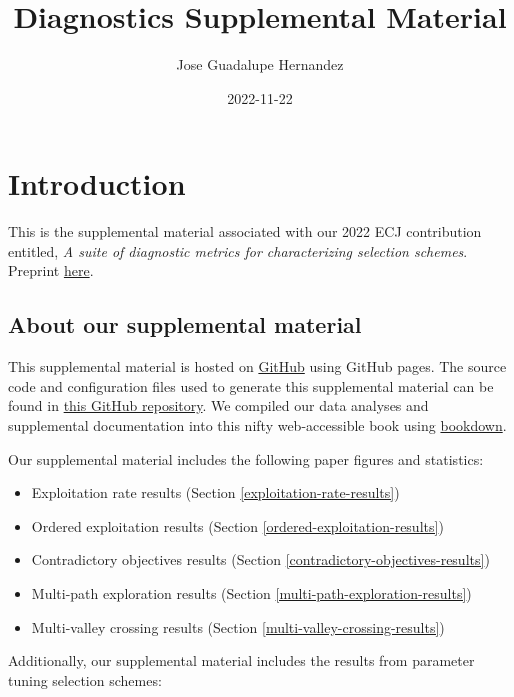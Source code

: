 \documentclass[]{book}
\title{Diagnostics Supplemental Material}
\author{Jose Guadalupe Hernandez}
\date{2022-11-22}
\providecommand{\tightlist}{%
  \setlength{\itemsep}{0pt}\setlength{\parskip}{0pt}}
\begin{document}
\maketitle

{
\setcounter{tocdepth}{1}
\tableofcontents
}
\hypertarget{introduction}{%
\chapter{Introduction}\label{introduction}}

This is the supplemental material associated with our 2022 ECJ contribution entitled, \emph{A suite of diagnostic metrics for characterizing selection schemes}.
Preprint \href{https://arxiv.org/pdf/2204.13839.pdf}{here}.

\hypertarget{about-our-supplemental-material}{%
\section{About our supplemental material}\label{about-our-supplemental-material}}

This supplemental material is hosted on \href{https://github.com}{GitHub} using GitHub pages.
The source code and configuration files used to generate this supplemental material can be found in \href{https://github.com/jgh9094/ECJ-2022-suite-of-diagnostics-for-selection-schemes}{this GitHub repository}.
We compiled our data analyses and supplemental documentation into this nifty web-accessible book using \href{https://bookdown.org/}{bookdown}.

Our supplemental material includes the following paper figures and statistics:

\begin{itemize}
\tightlist
\item
  Exploitation rate results (Section \ref{exploitation-rate-results})
\item
  Ordered exploitation results (Section \ref{ordered-exploitation-results})
\item
  Contradictory objectives results (Section \ref{contradictory-objectives-results})
\item
  Multi-path exploration results (Section \ref{multi-path-exploration-results})
\item
  Multi-valley crossing results (Section \ref{multi-valley-crossing-results})
\end{itemize}

Additionally, our supplemental material includes the results from parameter tuning selection schemes:
\end{document}
